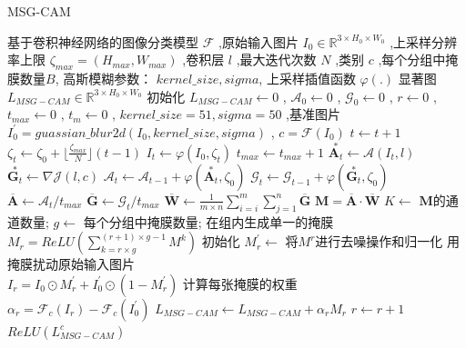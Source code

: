 \begin{algorithm}[!ht]
 	\caption{MSG-CAM}
 	\label{alg:1}
 	\renewcommand{\algorithmicrequire}{\textbf{输入:}}
 	\renewcommand{\algorithmicensure}{\textbf{输出:}}
 	\begin{algorithmic}[1]
 		\REQUIRE 基于卷积神经网络的图像分类模型 $\mathcal{F} $ ,原始输入图片 $I_0 \in \mathbb{R}^{3\times H_0 \times W_0}$ ,上采样分辨率上限 $\zeta_{max}=(H_{max},W_{max})$ ,卷积层 $l$ ,最大迭代次数 $N$ ,类别 $c$ ,每个分组中掩膜数量$B$, 高斯模糊参数： $kernel\_size,sigma$, 上采样插值函数 $\varphi(.)$
 		\ENSURE 显著图 $L_{MSG-CAM}\in \mathbb{R}^{3\times H_0 \times W_0}$
 		\STATE 初始化 $L_{MSG-CAM} \leftarrow 0$ , $\mathcal{A}_0 \leftarrow 0$ , $\mathcal{G}_0 \leftarrow 0$ , $r \leftarrow 0$ , $t_{max}\leftarrow 0$ , $t_m\leftarrow 0$ , $kernel\_size=51,sigma=50$ ,基准图片 $I^{\prime}_0=guassian\_blur2d(I_0,kernel\_size,sigma)$ , $c=\mathcal{F}(I_0)$
 		\STATE $t\leftarrow t+1$
 		\STATE $\zeta_t\leftarrow \zeta_0 +\lfloor\frac{\zeta_{max}}{N}\rfloor(t-1)$
 		\STATE $I_t\leftarrow \varphi(I_0,\zeta_t)$
 		\STATE $t_{max}\leftarrow t_{max}+1$
 		\STATE $\overset{*}{\boldsymbol{A}_t}\leftarrow \mathcal{A}(I_t,l)$
 		\STATE $\overset{*}{\boldsymbol{G}_t}\leftarrow \nabla\mathcal{J}(l,c)$
 		\STATE $\mathcal{A}_t \leftarrow \mathcal{A}_{t-1}+\varphi(\overset{*}{\boldsymbol{A}_t},\zeta_0)$
 		\STATE $\mathcal{G}_t \leftarrow \mathcal{G}_{t-1}+\varphi(\overset{*}{\boldsymbol{G}_t},\zeta_0)$
 		\ENDIF
 		\ENDWHILE
 		\STATE $\overline{\bm{A}}\leftarrow \mathcal{A}_t/t_{max}$
 		\STATE $\overline{\bm{G}}\leftarrow \mathcal{G}_t/t_{max}$
 		\STATE $\overline{\bm{W}}\leftarrow \frac{1}{m\times n}\sum_{i=i}^{m}\sum_{j=1}^{n}\overline{\bm{G}}$
 		\STATE $\boldsymbol{M}=\overline{\bm{A}}\cdot\overline{\bm{W}}$
 		\STATE $K\leftarrow$ $\boldsymbol{M}$的通道数量;
 		\STATE $g\leftarrow$ 每个分组中掩膜数量;
 		\STATE 在组内生成单一的掩膜\\ $M_r=ReLU(\sum_{k=r\times g}^{(r+1)\times g-1}M^k)$
 		\STATE 初始化 $M^{\prime}_r\leftarrow$ 将$M^r$进行去噪操作和归一化
 		\STATE 用掩膜扰动原始输入图片\\$I_r=I_0\odot M^{\prime}_r+I^{\prime}_0\odot (1-M^{\prime}_r)$
 		\STATE 计算每张掩膜的权重\\$\alpha_r=\mathcal{F}_c(I_r)-\mathcal{F}_c(I^{\prime}_0)$
 		\STATE $L_{MSG-CAM}\leftarrow L_{MSG-CAM}+\alpha_r M_r$
 		\STATE $r\leftarrow r+1$
 		\ENDWHILE
 		\RETURN $ReLU(L^c_{MSG-CAM})$
 	\end{algorithmic}
 \end{algorithm}

